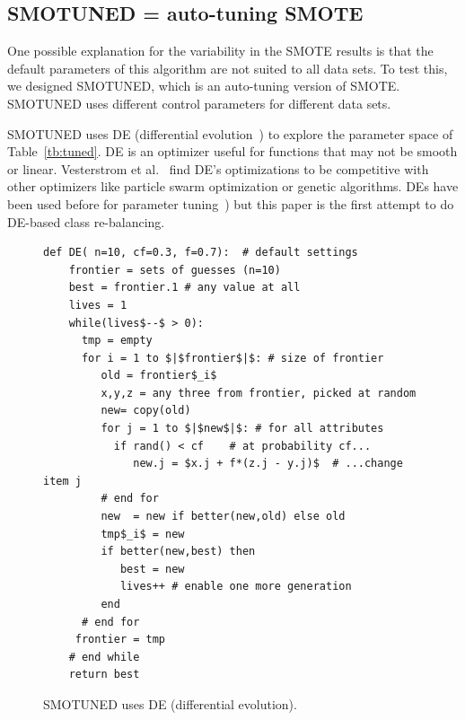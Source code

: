\documentclass[sigconf]{acmart}
\theoremstyle{break}
\theoremstyle{break}
\newcommand{\sma}{{\sc SMOTE}}
\newcommand{\smb}{{\sc SMOTUNED}}
\begin{document}
\subsection{SMOTUNED = auto-tuning {\sma}}
\label{sect:smotuned}

One possible explanation for the variability in the {\sma} results is that the
default parameters of this algorithm are not suited to all data sets. To test this,
we designed {\smb}, which is an auto-tuning version of {\sma}. {\smb}
uses different control parameters for different data sets.


 
{\smb} uses DE (differential evolution~\cite{storn1997differential}) to explore the parameter space of
Table~\ref{tb:tuned}.  DE is an
optimizer useful for functions that may not be smooth or linear.  Vesterstrom et al.~\cite{vesterstrom2004comparative} find   DE's optimizations to be  competitive with other optimizers like 
   particle swarm optimization or genetic algorithms.
   DEs have been used before for   parameter tuning~\cite{omran2005differential, chiha2012tuning,fu2016tuning,fu2017easy, agrawal2016wrong}) but this paper is  the first attempt to do
   DE-based class re-balancing.

\begin{figure}[!t]
\small 
\begin{lstlisting}[mathescape,linewidth=6.7cm,frame=none,numbers=right ]
  def DE( n=10, cf=0.3, f=0.7):  # default settings
    frontier = sets of guesses (n=10)
    best = frontier.1 # any value at all
    lives = 1
    while(lives$--$ > 0): 
      tmp = empty
      for i = 1 to $|$frontier$|$: # size of frontier
         old = frontier$_i$
         x,y,z = any three from frontier, picked at random
         new= copy(old)  
         for j = 1 to $|$new$|$: # for all attributes
           if rand() < cf    # at probability cf...
              new.j = $x.j + f*(z.j - y.j)$  # ...change item j
         # end for
         new  = new if better(new,old) else old
         tmp$_i$ = new 
         if better(new,best) then
            best = new
            lives++ # enable one more generation
         end                  
      # end for
     frontier = tmp
    # end while
    return best
\end{lstlisting} 
\caption{SMOTUNED uses DE (differential evolution).}
\label{fig:pseudo_DE} 
\vspace{-0.3cm}
\end{figure}
\end{document}
